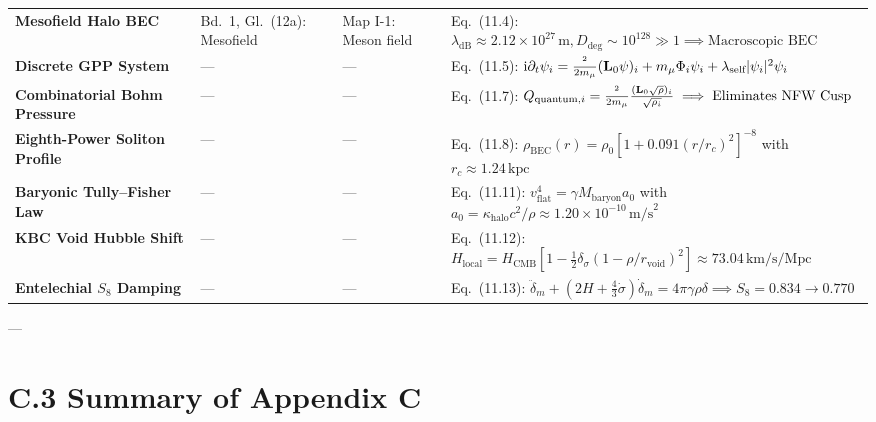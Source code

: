 \documentclass[
    12pt,
    a4paper,
    headings=normal,
    twoside=false,
    open=any,
    parskip=half
]{scrbook}
\let\hbar\relax
\newcommand{\iu}{\mathrm{i}}
\begin{document}
\begin{longtable}{p{3.4cm}p{3.2cm}p{3.2cm}p{5.4cm}}
\textbf{Mesofield Halo BEC} & Bd.~1, Gl.~(12a): Mesofield & Map I-1: Meson field& Eq.~(11.4): $\lambda_{\text{dB}} \approx 2.12 \times 10^{27}\,\text{m}, D_{\text{deg}} \sim 10^{128} \gg 1 \implies \text{Macroscopic BEC}$ \\
\textbf{Discrete GPP System} & — & — & Eq.~(11.5): $\iu\hbar\partial_t \psi_i = \frac{\hbar^2}{2m_\mu}(\mathbf{L}_0\psi)_i + m_\mu\Phi_i\psi_i + \lambda_{\text{self}}|\psi_i|^2\psi_i$ \\
\textbf{Combinatorial Bohm Pressure} & — & — & Eq.~(11.7): $Q_{\text{quantum}, i} = \frac{\hbar^2}{2m_\mu}\frac{(\mathbf{L}_0\sqrt{\rho})_i}{\sqrt{\rho_i}} \implies \text{Eliminates NFW Cusp}$ \\
\textbf{Eighth-Power Soliton Profile}& — & — & Eq.~(11.8): $\rho_{\text{BEC}}(r) = \rho_0 [1 + 0.091(r/r_c)^2]^{-8}$ with $r_c \approx 1.24\,\text{kpc}$ \\
\textbf{Baryonic Tully--Fisher Law} & — & — & Eq.~(11.11): $v_{\text{flat}}^4 = \gamma M_{\text{baryon}} a_0$ with $a_0 = \kappa_{\text{halo}} c^2/\rho \approx 1.20 \times 10^{-10}\,\text{m/s}^2$ \\
\textbf{KBC Void Hubble Shift} & — & — & Eq.~(11.12): $H_{\text{local}} = H_{\text{CMB}}[1 - \frac{1}{2}\delta_\sigma(1-\rho/r_{\text{void}})^2] \approx 73.04\,\text{km/s/Mpc}$ \\
\textbf{Entelechial $S_8$ Damping} & — & — & Eq.~(11.13): $\ddot{\delta}_m + (2H + \frac{4}{3}\dot{\sigma})\dot{\delta}_m = 4\pi\gamma\rho\delta \implies S_8 = 0.834 \to 0.770$ \\\bottomrule
\end{longtable}

---

\section{C.3 Summary of Appendix C}
\label{sec:appC_summary_audit}
\end{document}
